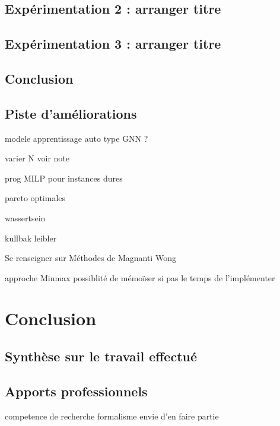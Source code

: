 \documentclass[12pt, a4paper, twoside]{article}
\numberwithin{equation}{section}
\begin{document}
    \subsection{Expérimentation 2 : arranger titre}



    \subsection{Expérimentation 3 : arranger titre}



    \subsection{Conclusion}


    
    \subsection{Piste d’améliorations}

    modele apprentissage auto type GNN ?

    varier N voir note 

    prog MILP pour instances dures

    pareto optimales

    wassertsein

    kullbak leibler

    Se renseigner sur Méthodes de Magnanti Wong

    approche Minmax possiblité de mémoïser si pas le temps de l'implémenter

    
	\clearpage
	\section{Conclusion}
	
	
	\subsection{Synthèse sur le travail effectué}
	
	
	\subsection{Apports professionnels}
	competence de recherche
    formalisme
    envie d'en faire partie
    
\end{document}
